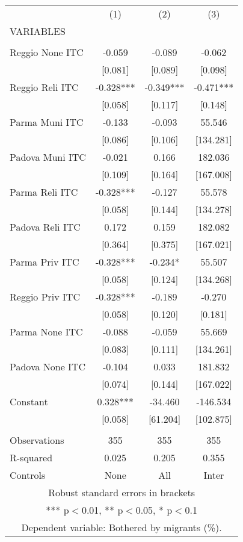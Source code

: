 \begin{tabular}{lccc} \hline
 & (1) & (2) & (3) \\
VARIABLES &  &  &  \\ \hline
 &  &  &  \\
Reggio None ITC & -0.059 & -0.089 & -0.062 \\
 & [0.081] & [0.089] & [0.098] \\
Reggio Reli ITC & -0.328*** & -0.349*** & -0.471*** \\
 & [0.058] & [0.117] & [0.148] \\
Parma Muni ITC & -0.133 & -0.093 & 55.546 \\
 & [0.086] & [0.106] & [134.281] \\
Padova Muni ITC & -0.021 & 0.166 & 182.036 \\
 & [0.109] & [0.164] & [167.008] \\
Parma Reli ITC & -0.328*** & -0.127 & 55.578 \\
 & [0.058] & [0.144] & [134.278] \\
Padova Reli ITC & 0.172 & 0.159 & 182.082 \\
 & [0.364] & [0.375] & [167.021] \\
Parma Priv ITC & -0.328*** & -0.234* & 55.507 \\
 & [0.058] & [0.124] & [134.268] \\
Reggio Priv ITC & -0.328*** & -0.189 & -0.270 \\
 & [0.058] & [0.120] & [0.181] \\
Parma None ITC & -0.088 & -0.059 & 55.669 \\
 & [0.083] & [0.111] & [134.261] \\
Padova None ITC & -0.104 & 0.033 & 181.832 \\
 & [0.074] & [0.144] & [167.022] \\
Constant & 0.328*** & -34.460 & -146.534 \\
 & [0.058] & [61.204] & [102.875] \\
 &  &  &  \\
Observations & 355 & 355 & 355 \\
R-squared & 0.025 & 0.205 & 0.355 \\
 Controls & None & All & Inter \\ \hline
\multicolumn{4}{c}{ Robust standard errors in brackets} \\
\multicolumn{4}{c}{ *** p$<$0.01, ** p$<$0.05, * p$<$0.1} \\
\multicolumn{4}{c}{ Dependent variable: Bothered by migrants (\%).} \\
\end{tabular}
